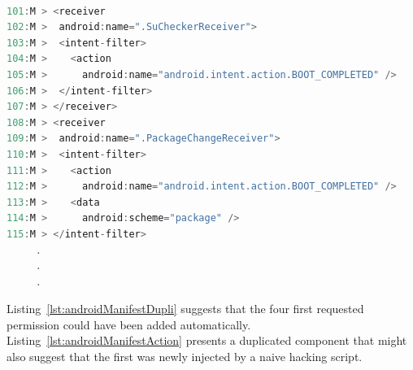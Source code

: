 \begin{lstlisting}[caption={An example of duplicated component capability from malicious version of app (com.koushikdutta.superuser)}, language=Java,
    basicstyle=\fontsize{6}{5}\selectfont\ttfamily,
    label={lst:androidManifestAction}]

101:M > <receiver
102:M >  android:name=".SuCheckerReceiver">
103:M >  <intent-filter>
104:M >    <action
105:M >      android:name="android.intent.action.BOOT_COMPLETED" />                 
106:M >  </intent-filter>
107:M > </receiver>
108:M > <receiver
109:M >  android:name=".PackageChangeReceiver">
110:M >  <intent-filter>
111:M >    <action
112:M >      android:name="android.intent.action.BOOT_COMPLETED" />
113:M >    <data
114:M >      android:scheme="package" />
115:M > </intent-filter>
     .
     .
     .
\end{lstlisting}

Listing~\ref{lst:androidManifestDupli} suggests that the four first requested permission could have been added automatically. Listing~\ref{lst:androidManifestAction} presents a duplicated component that might also suggest that the first was newly injected by a naive hacking script.



